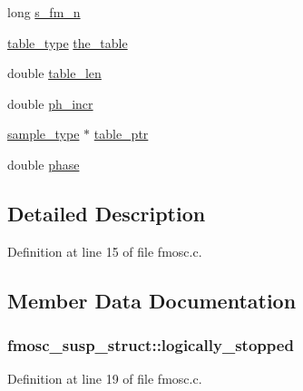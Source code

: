 \begin{DoxyCompactItemize}
\item 
long \hyperlink{structfmosc__susp__struct_ac8f55db77ab702897c668a97edf76634}{s\+\_\+fm\+\_\+n}
\item 
\hyperlink{sound_8h_a187b856587310160cfd8b383e7377171}{table\+\_\+type} \hyperlink{structfmosc__susp__struct_abf74c5eb78455f634af2ea1d7fff6683}{the\+\_\+table}
\item 
double \hyperlink{structfmosc__susp__struct_ad28ab2eb67e016ec5dd682f840564b08}{table\+\_\+len}
\item 
double \hyperlink{structfmosc__susp__struct_ad7bc073caf6e2b3523af2eff3d09c488}{ph\+\_\+incr}
\item 
\hyperlink{sound_8h_a3a9d1d4a1c153390d2401a6e9f71b32c}{sample\+\_\+type} $\ast$ \hyperlink{structfmosc__susp__struct_afa092daefc48c88e718b7c7d2cf77d06}{table\+\_\+ptr}
\item 
double \hyperlink{structfmosc__susp__struct_a669b5dd8e8900e69a3a4c7fb4859292b}{phase}
\end{DoxyCompactItemize}


\subsection{Detailed Description}


Definition at line 15 of file fmosc.\+c.



\subsection{Member Data Documentation}
\subsubsection[{\texorpdfstring{logically\+\_\+stopped}{logically_stopped}}]{ fmosc\+\_\+susp\+\_\+struct\+::logically\+\_\+stopped}\hypertarget{structfmosc__susp__struct_a04b94712bd1ff59f99e30528a8cca03b}{}\label{structfmosc__susp__struct_a04b94712bd1ff59f99e30528a8cca03b}


Definition at line 19 of file fmosc.\+c.


